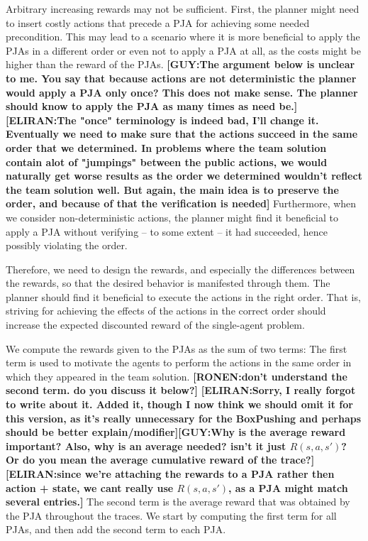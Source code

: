 \documentclass[letterpaper]{article} %
\newcommand{\eliran}[1]{\textbf{[\color{red}ELIRAN:#1]}}
\newcommand{\ronen}[1]{\textbf{[\color{blue}RONEN:#1]}}
\newcommand{\guy}[1]{\textbf{[\color{orange}GUY:#1]}}
\begin{document}
Arbitrary increasing rewards may not be sufficient. First, the planner might need to insert costly actions that precede a PJA for achieving some needed precondition. This may lead to a scenario where it is more beneficial to apply the PJAs in a different order or even not to apply a PJA at all, as the costs might be higher than the reward of the PJAs. 
\guy{The argument below is unclear to me. You say that {\bf because} actions are not deterministic the planner would apply a PJA only once? This does not make sense. The planner should know to apply the PJA as many times as need be.}\eliran{The "once" terminology is indeed bad, I'll change it. Eventually we need to make sure that the actions succeed in the same order that we determined. In problems where the team solution contain alot of "jumpings" between the public actions, we would naturally get worse results as the order we determined wouldn't reflect the team solution well. But again, the main idea is to preserve the order, and because of that the verification is needed}
Furthermore, when we consider non-deterministic actions, the planner might find it beneficial to apply a PJA without verifying -- to some extent -- it had succeeded, hence possibly violating the order.

Therefore, we need to design the rewards, and especially the differences between the rewards, so that the desired behavior is manifested through them. The planner should find it beneficial to execute the actions in the right order. That is, striving for achieving the effects of the actions in the correct order should increase the expected discounted reward of the single-agent problem.

We compute the rewards given to the PJAs as the sum of two terms:
The first term is used to motivate the agents to perform the actions in the same order in which they appeared in the team solution.
\ronen{don't understand the second term. do you discuss it below?}
\eliran{Sorry, I really forgot to write about it. Added it, though I now think we should omit it for this version, as it's really unnecessary for the BoxPushing and perhaps should be better explain/modifier}\guy{Why is the average reward important? Also, why is an average needed? isn't it just $R(s,a,s')$? Or do you mean the average cumulative reward of the trace?}\eliran{since we're attaching the rewards to a PJA rather then action + state, we cant really use $R(s,a,s')$, as a PJA might match several entries.}
The second term is the average reward that was obtained by the PJA throughout the traces.
We start by computing the first term for all PJAs, and then add the second term to each PJA.
\end{document}
